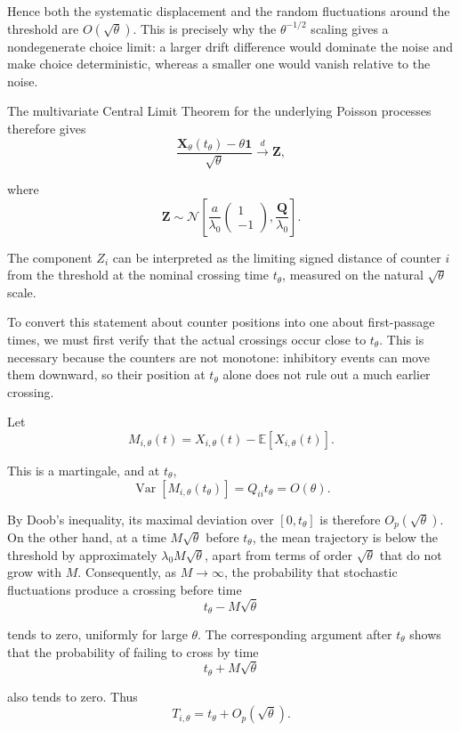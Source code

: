 \documentclass[
  man,
  floatsintext,
  longtable,
  a4paper,
  nolmodern,
  notxfonts,
  notimes,
  colorlinks=true,linkcolor=blue,citecolor=blue,urlcolor=blue]{apa7}
\begin{document}
Hence both the systematic displacement and the random fluctuations
around the threshold are \(O(\sqrt{\theta})\). This is precisely why the
\(\theta^{-1/2}\) scaling gives a nondegenerate choice limit: a larger
drift difference would dominate the noise and make choice deterministic,
whereas a smaller one would vanish relative to the noise.

The multivariate Central Limit Theorem for the underlying Poisson
processes therefore gives \[
\frac{
\mathbf X_\theta(t_\theta)-\theta\mathbf 1
}{
\sqrt{\theta}
}
\xrightarrow{d}
\mathbf Z,
\]

where \[
\mathbf Z
\sim
\mathcal N
\left[
\frac{a}{\lambda_0}
\begin{pmatrix}
1\\
-1
\end{pmatrix},
\frac{\mathbf Q}{\lambda_0}
\right].
\]

The component \(Z_i\) can be interpreted as the limiting signed distance
of counter \(i\) from the threshold at the nominal crossing time
\(t_\theta\), measured on the natural \(\sqrt{\theta}\) scale.

To convert this statement about counter positions into one about
first-passage times, we must first verify that the actual crossings
occur close to \(t_\theta\). This is necessary because the counters are
not monotone: inhibitory events can move them downward, so their
position at \(t_\theta\) alone does not rule out a much earlier
crossing.

Let \[
M_{i,\theta}(t)
=
X_{i,\theta}(t)-\mathbb E[X_{i,\theta}(t)].
\]

This is a martingale, and at \(t_\theta\), \[
\operatorname{Var}\!\left[M_{i,\theta}(t_\theta)\right]
=
Q_{ii}t_\theta
=
O(\theta).
\]

By Doob's inequality, its maximal deviation over \([0,t_\theta]\) is
therefore \(O_p(\sqrt{\theta})\). On the other hand, at a time
\(M\sqrt{\theta}\) before \(t_\theta\), the mean trajectory is below the
threshold by approximately \(\lambda_0M\sqrt{\theta}\), apart from terms
of order \(\sqrt{\theta}\) that do not grow with \(M\). Consequently, as
\(M\to\infty\), the probability that stochastic fluctuations produce a
crossing before time \[
t_\theta-M\sqrt{\theta}
\]

tends to zero, uniformly for large \(\theta\). The corresponding
argument after \(t_\theta\) shows that the probability of failing to
cross by time \[
t_\theta+M\sqrt{\theta}
\]

also tends to zero. Thus \[
T_{i,\theta}
=
t_\theta+O_p(\sqrt{\theta}).
\]
\end{document}
